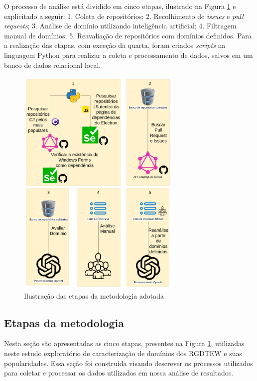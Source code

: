 \documentclass[12pt]{article}
\begin{document}
O processo de análise está dividido em cinco etapas, ilustrado na Figura \ref{fig:Metodologia} e explicitado a seguir: 1. Coleta de repositórios; 2. Recolhimento de \textit{issues} e \textit{pull requests}; 3. Análise de domínio utilizando inteligência artificial; 4. Filtragem manual de domínios; 5. Reavaliação de repositórios com domínios definidos. Para a realização das etapas, com exceção da quarta, foram criados \textit{scripts} na linguagem Python para realizar a coleta e processamento de dados, salvos em um banco de dados relacional local.

\begin{figure}[ht]
    \centering
    \includegraphics[width=0.7\textwidth]{images/metflow222.png}
    \caption{Ilustração das etapas da metodologia adotada}
    \label{fig:Metodologia}
\end{figure}

\subsection{Etapas da metodologia}

Nesta seção são apresentadas as cinco etapas, presentes na Figura \ref{fig:Metodologia}, utilizadas neste estudo exploratório de caracterização de domínios dos RGDTEW e suas popularidades. Essa seção foi construída visando descrever os processos utilizados para coletar e processar os dados utilizados em nossa análise de resultados.
\end{document}
